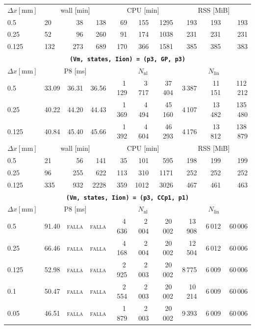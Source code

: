 \documentclass[11pt,a4paper]{article}
\newcommand{\code}[1]{\texttt{\small #1}}
\begin{document}
\begin{center}
\begin{longtable}{l|lrr|rrr|rrr}
\hline
$ \Delta x [\text{mm}] $ & \multicolumn{3}{c|}{wall [min]} & \multicolumn{3}{c|}{CPU [min]} & \multicolumn{3}{c|}{RSS [MiB]}\\
0.5 & 20 & 38 & 138 & 69 & 155 & 1295 & 193 & 193 & 193\\
0.25 & 52 & 96 & 260 & 91 & 174 & 1038 & 231 & 231 & 231\\
0.125 & 132 & 273 & 689 & 170 & 366 & 1581 & 385 & 385 & 383\\
\hline
\hline
\multicolumn{10}{c}{\textbf{\code{(Vm, states, Iion) = (p3, GP, p3)}}}\\\hline
$ \Delta x [\text{mm}] $ & \multicolumn{3}{c|}{P8 [ms]} & \multicolumn{3}{c|}{$N_{\mathrm{nl}}$} & \multicolumn{3}{c|}{$N_{\mathrm{lin}}$}\\
0.5 & 33.09 & 36.31 & 36.56 & 1\,129 & 3\,717 & 37\,404 & 3\,387 & 11\,151 & 112\,212\\
0.25 & 40.22 & 44.20 & 44.43 & 1\,369 & 4\,494 & 45\,160 & 4\,107 & 13\,482 & 135\,480\\
0.125 & 40.84 & 45.40 & 45.66 & 1\,392 & 4\,604 & 46\,293 & 4\,176 & 13\,812 & 138\,879\\
\hline
$ \Delta x [\text{mm}] $ & \multicolumn{3}{c|}{wall [min]} & \multicolumn{3}{c|}{CPU [min]} & \multicolumn{3}{c|}{RSS [MiB]}\\
0.5 & 21 & 56 & 141 & 35 & 101 & 595 & 198 & 199 & 199\\
0.25 & 96 & 255 & 622 & 113 & 310 & 1171 & 252 & 252 & 252\\
0.125 & 335 & 932 & 2228 & 359 & 1012 & 3026 & 467 & 461 & 463\\
\hline
\hline
\multicolumn{10}{c}{\textbf{\code{(Vm, states, Iion) = (p3, CCp1, p1)}}}\\\hline
$ \Delta x [\text{mm}] $ & \multicolumn{3}{c|}{P8 [ms]} & \multicolumn{3}{c|}{$N_{\mathrm{nl}}$} & \multicolumn{3}{c|}{$N_{\mathrm{lin}}$}\\
0.5 & 91.40 & \textsc{falla} & \textsc{falla} & 4\,636 & 2\,004 & 20\,002 & 13\,908 & 6\,012 & 60\,006\\
0.25 & 66.46 & \textsc{falla} & \textsc{falla} & 4\,168 & 2\,004 & 20\,002 & 12\,504 & 6\,012 & 60\,006\\
0.125 & 52.98 & \textsc{falla} & \textsc{falla} & 2\,925 & 2\,003 & 20\,002 & 8\,775 & 6\,009 & 60\,006\\
0.1 & 50.47 & \textsc{falla} & \textsc{falla} & 2\,554 & 2\,003 & 20\,002 & 10\,214 & 6\,009 & 60\,006\\
0.05 & 46.51 & \textsc{falla} & \textsc{falla} & 1\,879 & 2\,003 & 20\,002 & 9\,393 & 6\,009 & 60\,006\\

\end{longtable}
\end{center}
\end{document}
